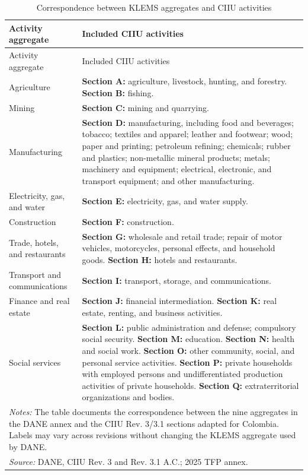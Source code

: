 \small
\begin{longtable}{p{4.0cm}p{10.5cm}}
\caption{Correspondence between KLEMS aggregates and CIIU activities}
\label{tab:paper_sector_mapping}\\
\toprule
Activity aggregate & Included CIIU activities \\
\midrule
\endfirsthead
\toprule
Activity aggregate & Included CIIU activities \\
\midrule
\endhead
Agriculture &
\textbf{Section A:} agriculture, livestock, hunting, and forestry.
\textbf{Section B:} fishing. \\
\addlinespace
Mining &
\textbf{Section C:} mining and quarrying. \\
\addlinespace
Manufacturing &
\textbf{Section D:} manufacturing, including food and beverages; tobacco;
textiles and apparel; leather and footwear; wood; paper and printing;
petroleum refining; chemicals; rubber and plastics; non-metallic mineral
products; metals; machinery and equipment; electrical, electronic, and
transport equipment; and other manufacturing. \\
\addlinespace
Electricity, gas, and water &
\textbf{Section E:} electricity, gas, and water supply. \\
\addlinespace
Construction &
\textbf{Section F:} construction. \\
\addlinespace
Trade, hotels, and restaurants &
\textbf{Section G:} wholesale and retail trade; repair of motor vehicles,
motorcycles, personal effects, and household goods.
\textbf{Section H:} hotels and restaurants. \\
\addlinespace
Transport and communications &
\textbf{Section I:} transport, storage, and communications. \\
\addlinespace
Finance and real estate &
\textbf{Section J:} financial intermediation.
\textbf{Section K:} real estate, renting, and business activities. \\
\addlinespace
Social services &
\textbf{Section L:} public administration and defense; compulsory social security.
\textbf{Section M:} education.
\textbf{Section N:} health and social work.
\textbf{Section O:} other community, social, and personal service activities.
\textbf{Section P:} private households with employed persons and undifferentiated
production activities of private households.
\textbf{Section Q:} extraterritorial organizations and bodies. \\
\bottomrule
\multicolumn{2}{p{14.4cm}}{\footnotesize \textit{Notes:} The table documents
the correspondence between the nine aggregates in the DANE annex and the
CIIU Rev. 3/3.1 sections adapted for Colombia. Labels may vary across revisions
without changing the KLEMS aggregate used by DANE.}\\
\multicolumn{2}{l}{\footnotesize \textit{Source:} DANE, CIIU Rev. 3 and Rev. 3.1 A.C.; 2025 TFP annex.}\\
\end{longtable}
\normalsize
